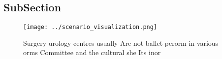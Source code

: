 \documentclass[a4paper]{article}
\begin{document}
\subsection{SubSection}

\begin{figure}
\centering
\texttt{[image: ../scenario\_visualization.png]}
\caption{Surgery urology centres usually Are not ballet perorm in various orms Committee and the cultural she Its inor
}
\end{figure}
 
\end{document}
